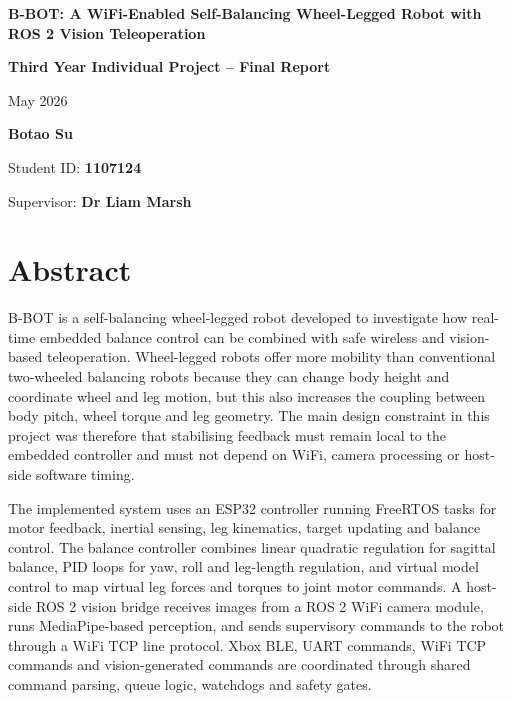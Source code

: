 \documentclass[12pt, a4paper]{article}
\begin{document}
\hypersetup{pageanchor=false}

\begin{titlepage}
    \centering
    \vspace*{2cm}
    {\fontsize{24pt}{28pt}\selectfont \textbf{B-BOT: A WiFi-Enabled Self-Balancing Wheel-Legged Robot with ROS 2 Vision Teleoperation}\par}
    \vspace{2cm}
    {\Large \textbf{Third Year Individual Project -- Final Report}\par}
    \vspace{1cm}
    {\large May 2026\par}
    \vspace{3cm}
    {\large \textbf{Botao Su}\par}
    \vspace{0.5cm}
    {\large Student ID: \textbf{1107124}\par}
    \vspace{3cm}
    {\large Supervisor: \textbf{Dr Liam Marsh}\par}
    \vfill
\end{titlepage}
\hypersetup{pageanchor=true}

\newpage
\section*{Abstract}
B-BOT is a self-balancing wheel-legged robot developed to investigate how real-time embedded balance control can be combined with safe wireless and vision-based teleoperation. Wheel-legged robots offer more mobility than conventional two-wheeled balancing robots because they can change body height and coordinate wheel and leg motion, but this also increases the coupling between body pitch, wheel torque and leg geometry. The main design constraint in this project was therefore that stabilising feedback must remain local to the embedded controller and must not depend on WiFi, camera processing or host-side software timing.

The implemented system uses an ESP32 controller running FreeRTOS tasks for motor feedback, inertial sensing, leg kinematics, target updating and balance control. The balance controller combines linear quadratic regulation for sagittal balance, PID loops for yaw, roll and leg-length regulation, and virtual model control to map virtual leg forces and torques to joint motor commands. A host-side ROS 2 vision bridge receives images from a ROS 2 WiFi camera module, runs MediaPipe-based perception, and sends supervisory commands to the robot through a WiFi TCP line protocol. Xbox BLE, UART commands, WiFi TCP commands and vision-generated commands are coordinated through shared command parsing, queue logic, watchdogs and safety gates.
\end{document}
